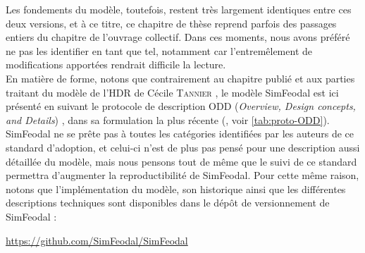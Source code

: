 \begin{mdframed}[backgroundcolor=black!5,footnoteinside=false]
Les fondements du modèle, toutefois, restent très largement identiques entre ces deux versions, et à ce titre, ce chapitre de thèse reprend parfois des passages entiers du chapitre de l'ouvrage collectif.
Dans ces moments, nous avons préféré ne pas les identifier en tant que tel, notamment car l'entremêlement de modifications apportées rendrait difficile la lecture.\\
En matière de forme, notons que contrairement au chapitre publié et aux parties traitant du modèle de l'HDR de Cécile \textsc{Tannier} \autocite{tannier_analyse_2017}, le modèle SimFeodal est ici présenté en suivant le protocole de description \og ODD\fg{} (\textit{Overview, Design concepts, and Details}) \autocite{grimm_odd_2010}, dans sa formulation la plus récente (\cite{grimm_documenting_2017}, voir \cref{tab:proto-ODD}).\\
SimFeodal ne se prête pas à toutes les catégories identifiées par les auteurs de ce standard d'adoption, et celui-ci n'est de plus pas pensé pour une description aussi détaillée du modèle, mais nous pensons tout de même que le suivi de ce standard permettra d'augmenter la reproductibilité de SimFeodal.
Pour cette même raison, notons que l'implémentation du modèle, son historique ainsi que les différentes descriptions techniques sont disponibles dans le dépôt de versionnement de SimFeodal :
\begin{center}\vspace{-0.5cm}
	\href{https://github.com/SimFeodal/SimFeodal}{https://github.com/SimFeodal/SimFeodal}
\end{center}\vspace{-0.15cm}
\end{mdframed}

\clearpage

